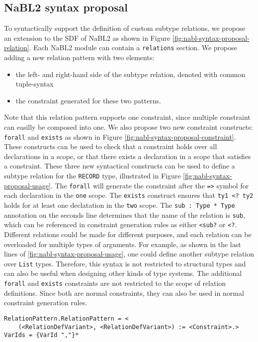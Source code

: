 \subsection{NaBL2 syntax proposal}
To syntactically support the definition of custom subtype relations, 
we propose an extension to the SDF of NaBL2 as shown in Figure \ref{fig:nabl-syntax-proposal-relation}.
Each NaBL2 module can contain a \texttt{relations} section.
We propose adding a new relation pattern with two elements: 
\begin{itemize}
\item the left- and right-hand side of the subtype relation, denoted with common tuple-syntax
\item the constraint generated for these two patterns.
\end{itemize}
Note that this relation pattern supports one constraint, 
since multiple constraint can easilly be composed into one.
We also propose two new constraint constructs: \texttt{forall} and \texttt{exists} as shown in Figure \ref{fig:nabl-syntax-proposal-constraint}.
These constructs can be used to check that a constraint holds over all declarations in a scope, 
or that there exists a declaration in a scope that satisfies a constraint.
These three new syntactical constructs can be used to define a subtype relation for the \texttt{RECORD} type,
illustrated in Figure \ref{fig:nabl-syntax-proposal-usage}.
The \texttt{forall} will generate the constraint after the \texttt{=>} symbol for each declaration in the \texttt{one} scope.
The \texttt{exists} construct ensures that \texttt{ty1 <? ty2} holds for at least one declatation in the \texttt{two} scope.
The \texttt{sub : Type * Type} annotation on the seconds line determines that the name of the relation is \texttt{sub},
which can be referenced in constraint generation rules as either \texttt{<sub?} or \texttt{<?}.
Different relations could be made for different purposes, and each relation can be overloaded for multiple types of arguments.
For example, as shown in the last lines of \ref{fig:nabl-syntax-proposal-usage}, one could define another subtype relation over \texttt{List} types.
Therefore, this syntax is not restricted to structural types and can also be useful when designing other kinds of type systems.
The additional \texttt{forall} and \texttt{exists} constraints are not restricted to the scope of relation definitions.
Since both are normal constraints, they can also be used in normal constraint generation rules.

\begin{figure*}
\begin{lstlisting}
RelationPattern.RelationPattern = <
	(<RelationDefVariant>, <RelationDefVariant>) := <Constraint>.>
VarIds = {VarId ","}*
\end{lstlisting}
\caption{The syntax proposal for NaBL2 relation definitions.}
\label{fig:nabl-syntax-proposal-relation}
\end{figure*}

